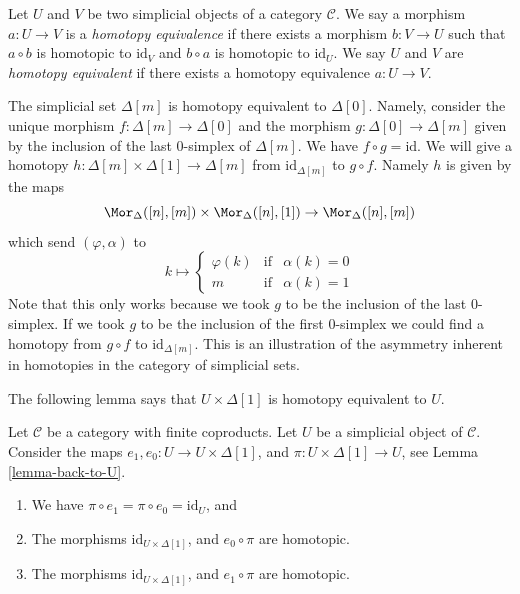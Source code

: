 \begin{definition}
\label{definition-homotopy-equivalent}
Let $U$ and $V$ be two simplicial objects of a category $\mathcal{C}$.
We say a morphism $a : U \to V$ is a {\it homotopy equivalence}
if there exists a morphism $b : V \to U$ such that $a \circ b$ is
homotopic to $\text{id}_V$ and $b \circ a$ is homotopic to $\text{id}_U$.
We say $U$ and $V$ are {\it homotopy equivalent} if there
exists a homotopy equivalence $a : U \to V$.
\end{definition}

\begin{example}
\label{example-simplex-contractible}
The simplicial set $\Delta[m]$ is homotopy equivalent to $\Delta[0]$.
Namely, consider the unique morphism $f : \Delta[m] \to \Delta[0]$ and
the morphism $g : \Delta[0] \to \Delta[m]$ given by the inclusion of the
last $0$-simplex of $\Delta[m]$. We have $f \circ g = \text{id}$.
We will give a homotopy $h : \Delta[m] \times \Delta[1] \to \Delta[m]$
from $\text{id}_{\Delta[m]}$ to $g \circ f$. Namely $h$ is given by
the maps
$$
\Mor_\Delta([n], [m]) \times \Mor_\Delta([n], [1]) \to \Mor_\Delta([n], [m])
$$
which send $(\varphi, \alpha)$ to
$$
k \mapsto
\left\{
\begin{matrix}
\varphi(k) & \text{if} & \alpha(k) = 0 \\
m & \text{if} & \alpha(k) = 1
\end{matrix}
\right.
$$
Note that this only works because we took $g$ to be the inclusion of the
last $0$-simplex. If we took $g$ to be the inclusion of the first $0$-simplex
we could find a homotopy from $g \circ f$ to $\text{id}_{\Delta[m]}$.
This is an illustration of the asymmetry inherent in homotopies in the
category of simplicial sets.
\end{example}

\noindent
The following lemma says that $U \times \Delta[1]$
is homotopy equivalent to $U$.

\begin{lemma}
\label{lemma-contractible}
Let $\mathcal{C}$ be a category with finite coproducts.
Let $U$ be a simplicial object of $\mathcal{C}$.
Consider the maps $e_1, e_0 : U \to U \times \Delta[1]$,
and $\pi : U \times \Delta[1] \to U$, see
Lemma \ref{lemma-back-to-U}.
\begin{enumerate}
\item We have $\pi \circ e_1 = \pi \circ e_0 = \text{id}_U$, and
\item The morphisms $\text{id}_{U \times \Delta[1]}$,
and $e_0 \circ \pi$ are homotopic.
\item The morphisms $\text{id}_{U \times \Delta[1]}$,
and $e_1 \circ \pi$ are homotopic.
\end{enumerate}
\end{lemma}

